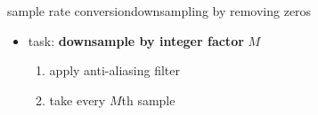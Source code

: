 	\begin{frame}{sample rate conversion}{downsampling by removing zeros}
        \begin{itemize}
            \item   task: \textbf{downsample by integer factor} $M$
            \pause 
            \begin{enumerate}
                \item   apply anti-aliasing filter
                \item   take every $M$th sample
            \end{enumerate}
        \end{itemize}
        \vspace{50mm}
    \end{frame}
